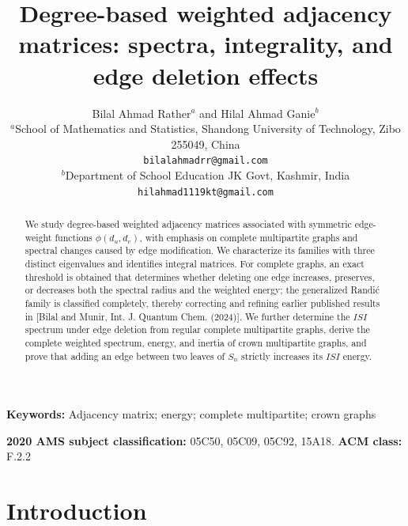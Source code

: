 \documentclass[12pt,twoside]{article}
\providecommand{\keywords}[1]
{
	\noindent\textbf{Keywords:} #1
}
\providecommand{\ams}[2]
{
	\noindent\textbf{2020 AMS subject classification:} #2
}
\begin{document}
\title{Degree-based weighted adjacency matrices: spectra, integrality, and edge deletion effects}
\author{
	{\small Bilal Ahmad Rather$^{a}$ and Hilal Ahmad Ganie$^{b}$} \\[2mm]
	\small $^{a}$School of Mathematics and Statistics, Shandong University of Technology, Zibo 255049, China\\
	\texttt{bilalahmadrr@gmail.com}\\
	\small $^{b}$Department of School  Education JK Govt, Kashmir, India\\
	\texttt{hilahmad1119kt@gmail.com}
}

\date{}

\pagestyle{myheadings} 
\maketitle
\begin{abstract}
	We study degree-based weighted adjacency matrices associated with symmetric edge-weight functions $\phi(d_u,d_v)$, with emphasis on complete multipartite graphs and spectral changes caused by edge modification. We characterize its families with three distinct eigenvalues and identifies integral matrices. For complete graphs, an exact threshold is obtained that determines whether deleting one edge increases, preserves, or decreases both the spectral radius and the weighted energy; the generalized Randić family is classified completely, thereby correcting and refining earlier published results in [Bilal and Munir, Int. J. Quantum Chem. (2024)]. 
	 We further determine the $ISI$ spectrum under edge deletion from regular complete multipartite graphs, derive the complete weighted spectrum, energy, and inertia of crown multipartite graphs, and prove that adding an edge between two leaves of $S_n$ strictly increases its $ISI$ energy.
\end{abstract}



\vskip 3mm

\keywords{Adjacency matrix; energy; complete multipartite; crown graphs}

\ams{}{05C50, 05C09, 05C92, 15A18.} \textbf{ACM class:} F.2.2

\section{Introduction}\label{section}
\end{document}
